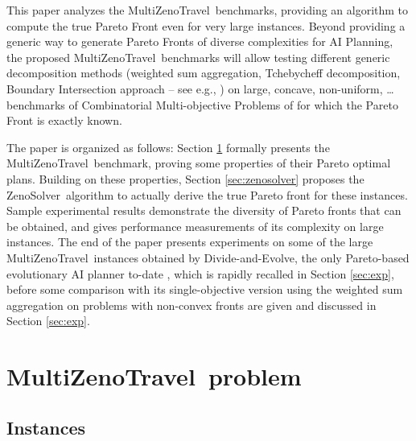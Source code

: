 \documentclass{llncs}
\def\MULTIZENO{{\sc MultiZenoTravel}}
\def\ZENOSOLVER{{\sc ZenoSolver}}
\begin{document}
This paper analyzes the \MULTIZENO\ benchmarks, providing an algorithm to compute the true Pareto Front even for very large instances. Beyond providing a generic way to generate Pareto Fronts of diverse complexities for AI Planning, the proposed \MULTIZENO\ benchmarks will allow testing different generic decomposition methods (weighted sum aggregation, Tchebycheff decomposition, Boundary Intersection approach -- see e.g., \cite{Zhang-MOEAD-TEC07}) on large, concave, non-uniform, \ldots benchmarks of Combinatorial Multi-objective Problems of for which the Pareto Front is exactly known. 

The paper is organized as follows: Section \ref{sec:multizeno} formally presents the  \MULTIZENO\ benchmark, proving some properties of their Pareto optimal plans. Building on these properties, Section \ref{sec:zenosolver} proposes the \ZENOSOLVER\ algorithm to actually derive the true Pareto front for these instances. Sample experimental results demonstrate the diversity of Pareto fronts that can be obtained, and gives performance measurements of its complexity on large instances. The end of the paper presents experiments on some of the large \MULTIZENO\ instances obtained by Divide-and-Evolve, the only Pareto-based evolutionary AI planner to-date \cite{IJCAI2013}, which is rapidly recalled in Section \ref{sec:exp}, before some comparison with its single-objective version using the weighted sum aggregation on problems with non-convex fronts are given and discussed in Section \ref{sec:exp}.

\section{\MULTIZENO\ problem}
\label{sec:multizeno}
\subsection{Instances}
\end{document}

